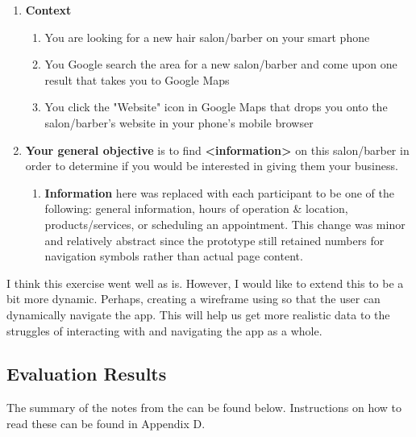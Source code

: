 \begin{enumerate}
\item
  \textbf{Context}
  \begin{enumerate}
  \item
    You are looking for a new hair salon/barber on your smart phone
  \item
    You Google search the area for a new salon/barber and come upon one result that takes you to Google Maps
  \item
    You click the "Website" icon in Google Maps that drops you onto the salon/barber's website in your phone's mobile browser
  \end{enumerate}
\item
  \textbf{Your general objective} is to find \textbf{<information>} on this salon/barber in order to determine if you would be interested in giving them your business.
  \begin{enumerate}
  \item
    \textbf{Information} here was replaced with each participant to be one of the following: general information, hours of operation \& location, products/services, or scheduling an appointment. This change was minor and relatively abstract since the prototype still retained numbers for navigation symbols rather than actual page content.
  \end{enumerate}
\end{enumerate}

\clearpage

I think this exercise went well as is. However, I would like to extend this to be a bit more dynamic. Perhaps, creating a wireframe using  so that the user can dynamically navigate the app. This will help us get more realistic data to the struggles of interacting with and navigating the app as a whole.

\subsection{Evaluation Results}

The summary of the notes from the  can be found below. Instructions on how to read these can be found in Appendix D.

